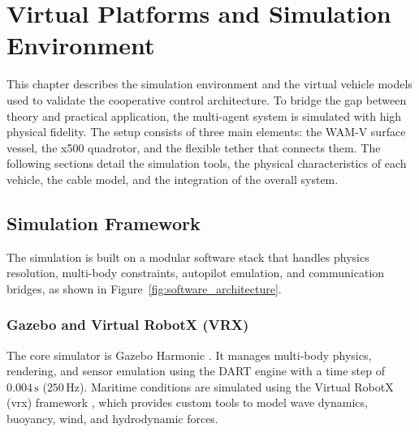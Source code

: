 
\chapter{Virtual Platforms and Simulation Environment}
\label{chapter:virtual_platforms}

This chapter describes the simulation environment and the virtual vehicle models used to validate the cooperative control architecture. To bridge the gap between theory and practical application, the multi-agent system is simulated with high physical fidelity. The setup consists of three main elements: the WAM-V surface vessel, the x500 quadrotor, and the flexible tether that connects them. The following sections detail the simulation tools, the physical characteristics of each vehicle, the cable model, and the integration of the overall system.

\section{Simulation Framework}
\label{sec:sim_ecosystem}

The simulation is built on a modular software stack that handles physics resolution, multi-body constraints, autopilot emulation, and communication bridges, as shown in Figure~\ref{fig:software_architecture}.

    \subsection{Gazebo and Virtual RobotX (VRX)}
    The core simulator is Gazebo Harmonic \cite{koenig2004gazebo}. It manages multi-body physics, rendering, and sensor emulation using the DART engine \cite{lee2018dart} with a time step of $0.004\,\text{s}$ ($250\,\text{Hz}$). Maritime conditions are simulated using the Virtual RobotX (\gls{vrx}) framework \cite{bingham2019vrx}, which provides custom tools to model wave dynamics, buoyancy, wind, and hydrodynamic forces.

